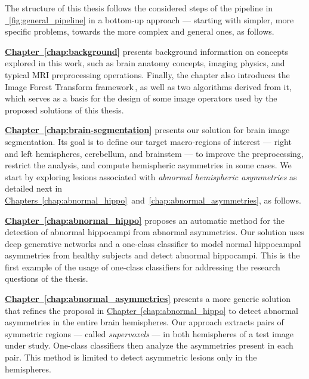 The structure of this thesis follows the considered steps of the pipeline in \hyperref[fig:general_pipeline]{\fig~\ref{fig:general_pipeline}} in a bottom-up approach --- starting with simpler, more specific problems, towards the more complex and general ones, as follows.

\textbf{\hyperref[chap:background]{Chapter~\ref{chap:background}}} presents background information on concepts explored in this work, such as brain anatomy concepts, imaging physics, and typical MRI preprocessing operations. Finally, the chapter also introduces the Image Forest Transform framework\,\cite{Falcao-2004-PAMI-IFT}, as well as two algorithms derived from it, which serves as a basis for the design of some image operators used by the proposed solutions of this thesis.

\textbf{\hyperref[chap:brain-segmentation]{Chapter~\ref{chap:brain-segmentation}}} presents our solution for brain image segmentation. Its goal is to define our target macro-regions of interest --- \ie right and left hemispheres, cerebellum, and brainstem --- to improve the preprocessing, restrict the analysis, and compute hemispheric asymmetries in some cases. We start by exploring lesions associated with \emph{abnormal hemispheric asymmetries} as detailed next in \hyperref[chap:abnormal_hippo]{Chapters~\ref{chap:abnormal_hippo}}~and~\ref{chap:abnormal_asymmetries}, as follows.

\textbf{\hyperref[chap:abnormal_hippo]{Chapter~\ref{chap:abnormal_hippo}}} proposes an automatic method for the detection of abnormal hippocampi from abnormal asymmetries. Our solution uses deep generative networks and a one-class classifier to model normal hippocampal asymmetries from healthy subjects and detect abnormal hippocampi. This is the first example of the usage of one-class classifiers for addressing the research questions of the thesis. %

\textbf{\hyperref[chap:abnormal_asymmetries]{Chapter~\ref{chap:abnormal_asymmetries}}} presents a more generic solution that refines the proposal in \hyperref[chap:abnormal_hippo]{Chapter~\ref{chap:abnormal_hippo}} to detect abnormal asymmetries in the entire brain hemispheres. Our approach extracts pairs of symmetric regions --- called \emph{supervoxels} --- in both hemispheres of a test image under study.  One-class classifiers then analyze the asymmetries present in each pair. This method is limited to detect asymmetric lesions only in the hemispheres.

